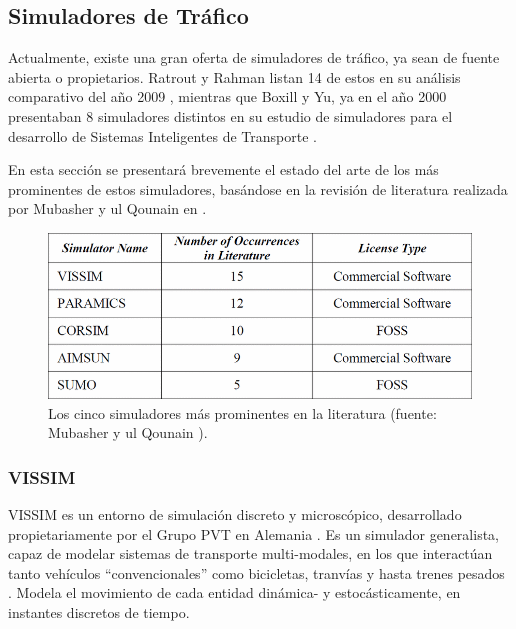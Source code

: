 \subsection{Simuladores de Tráfico}

Actualmente, existe una gran oferta de simuladores de tráfico, ya sean de fuente abierta o propietarios. Ratrout y Rahman listan 14 de estos en su análisis comparativo del año 2009 \autocite{ratrout2009comparative}, mientras que Boxill y Yu, ya en el año 2000 presentaban 8 simuladores distintos en su estudio de simuladores para el desarrollo de Sistemas Inteligentes de Transporte \autocite{boxill2000evaluation}.

En esta sección se presentará brevemente el estado del arte de los más prominentes de estos simuladores, basándose en la revisión de literatura realizada por Mubasher y ul Qounain en \autocite{traffic_sim_review}.

\begin{figure}
    \centering
    \includegraphics[width=\linewidth]{figuras/popular_trafficsims}
    \caption[Tabla comparativa simuladores de tráfico.]{Los cinco simuladores más prominentes en la literatura (fuente: Mubasher y ul Qounain \autocite{traffic_sim_review}).}
    \label{fig:prom_trafficsim}
\end{figure}

\subsubsection{VISSIM}

VISSIM es un entorno de simulación discreto y microscópico, desarrollado propietariamente por el Grupo PVT en Alemania \autocite{vissim}. Es un simulador generalista, capaz de modelar sistemas de transporte multi-modales, en los que interactúan tanto vehículos ``convencionales'' como bicicletas, tranvías y hasta trenes pesados \autocite{fellendorf2010microscopic}. Modela el movimiento de cada entidad dinámica- y estocásticamente, en instantes discretos de tiempo. 


